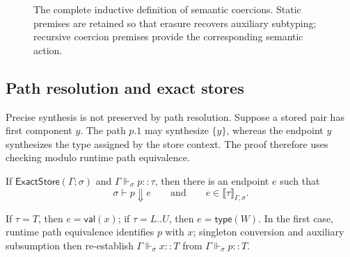\documentclass[acmsmall,screen,nonacm]{acmart}
\newcommand{\sing}[1]{\{#1\}}
\newcommand{\pairty}[4]{\langle #1\!:\!#2;\,#3\!:\!#4\rangle}
\newcommand{\subst}[3]{#1[#2/#3]}
\newcommand{\resolve}{\Downarrow}
\newcommand{\semmap}{\mathrel{\Rightarrow_{\!s}}}
\newcommand{\struct}{\Vdash}
\newcommand{\storeexact}{\mathsf{ExactStore}}
\begin{document}
\begin{figure}[H]
\begin{minipage}{\textwidth}
\end{minipage}
\caption{The complete inductive definition of semantic coercions. Static
premises are retained so that erasure recovers auxiliary subtyping; recursive
coercion premises provide the corresponding semantic action.}
\label{fig:coercions}
\end{figure}

\subsection{Path resolution and exact stores}

Precise synthesis is not preserved by path resolution. Suppose a stored pair
has first component \(y\). The path \(p.1\) may synthesize \(\sing{y}\),
whereas the endpoint \(y\) synthesizes the type assigned by the store context.
The proof therefore uses checking modulo runtime path equivalence.

\begin{lemma}
\label{lem:path-resolution}
If \(\storeexact(\Gamma;\sigma)\) and
\(\Gamma\struct_{\sigma}p::\tau\), then there is an endpoint \(e\)
such that
\[
\sigma\vdash p\resolve e
\qquad\text{and}\qquad
e\in\llbracket\tau\rrbracket_{\Gamma,\sigma}.
\]
\end{lemma}

If \(\tau=T\), then \(e=\mathsf{val}(x)\); if \(\tau=L..U\), then
\(e=\mathsf{type}(W)\). In the first case, runtime path
equivalence identifies \(p\) with \(x\); singleton conversion and auxiliary
subsumption then re-establish \(\Gamma\struct_{\sigma}x::T\) from
\(\Gamma\struct_{\sigma}p::T\).
\end{document}

